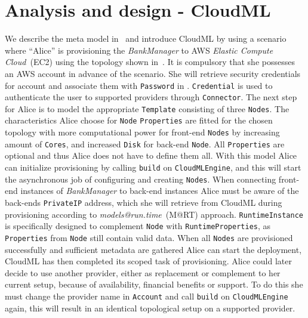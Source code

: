 \chapter{Analysis and design - CloudML}



We describe the meta model in~ and introduce CloudML by
using a scenario where ``Alice'' is provisioning the \emph{BankManager} to AWS \emph{Elastic Compute Cloud}~(EC2)
using the topology shown in~.
It is compulsory that she possesses an AWS account in advance of the scenario.
She will retrieve security credentials for account 
and associate them with \texttt{Password} in .
\texttt{Credential} is used to authenticate the user to supported providers through \texttt{Connector}.
The next step for Alice is to model the appropriate \texttt{Template} consisting
of three \texttt{Nodes}.
The characteristics Alice choose for \texttt{Node} \texttt{Properties} are fitted
for the chosen topology with more computational power for front-end \texttt{Nodes}
by increasing amount of \texttt{Cores}, and increased \texttt{Disk} for back-end \texttt{Node}.
All \texttt{Properties} are optional and thus Alice does not have to define them all.
With this model Alice can initialize provisioning by calling \texttt{build} on \texttt{CloudMLEngine},
and this will start the asynchronous job of configuring and creating \texttt{Nodes}.
When connecting front-end instances of \emph{BankManager} to back-end instances Alice must 
be aware of the back-ends \texttt{PrivateIP} address, which she will retrieve from CloudML
during provisioning according to \emph{models@run.time}~(M@RT) approach.
\texttt{RuntimeInstance} is specifically designed to complement \texttt{Node} with \texttt{RuntimeProperties},
as \texttt{Properties} from \texttt{Node} still contain valid data.
When all \texttt{Nodes} are provisioned successfully and sufficient metadata are gathered
Alice can start the deployment, CloudML has then completed its scoped task of provisioning.
Alice could later decide to use another provider, either as replacement or complement to her current setup,
because of availability, financial benefits  or support.
To do this she must change the provider name in \texttt{Account} and call \texttt{build} on \texttt{CloudMLEngine} again,
this will result in an identical topological setup on a supported provider.

